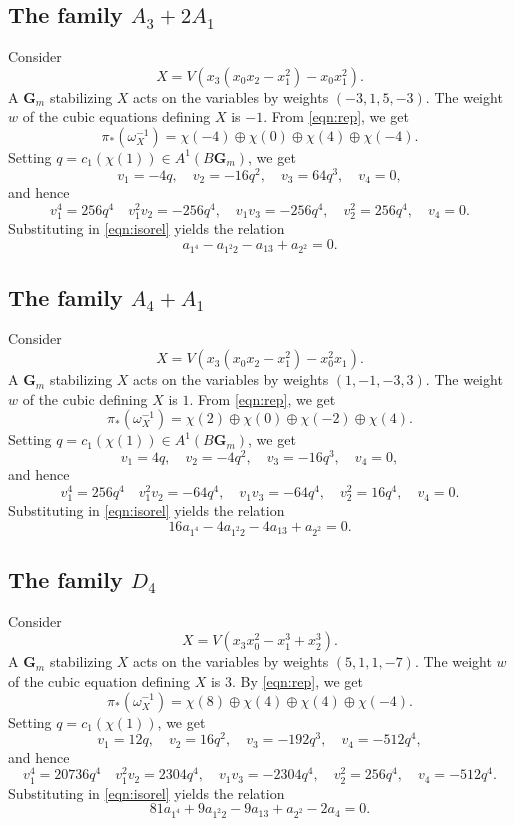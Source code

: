 \documentclass[12pt,reqno]{amsart}
\numberwithin{equation}{section}
\newcommand{\G}{\mathbf G}
\begin{document}
\subsection{The family $A_3 + 2A_1$}
Consider
\[ X = V(x_3(x_0x_2-x_1^2) - x_0x_1^2).\]
A $\G_m$ stabilizing $X$ acts on the variables by weights $(-3,1,5,-3)$.
The weight $w$ of the cubic equations defining $X$ is $-1$.
From \eqref{eqn:rep}, we get
\[ \pi_*\left( \omega_X^{-1} \right) = \chi(-4) \oplus \chi(0) \oplus \chi(4) \oplus \chi(-4).\]
Setting $q = c_1(\chi(1)) \in A^1(B\G_m)$, we get
\[ v_1 = -4q, \quad v_2 = -16q^2, \quad v_3 = 64q^3, \quad v_4 = 0,\]
and hence
\[ v_1^4 = 256q^4 \quad v_1^2v_2 = -256q^4, \quad v_1v_3 = -256q^4, \quad v_2^2 = 256q^4, \quad v_4 = 0.\]
Substituting in \eqref{eqn:isorel} yields the relation
\begin{equation}\label{eqn:iso2}
  a_{1^4} - a_{1^2 2}- a_{13} +  a_{2^2}  = 0.
\end{equation}

\subsection{The family $A_4 + A_1$}
Consider
\[ X = V(x_3(x_0x_2-x_1^2) - x_0^2x_1).\]
A $\G_m$ stabilizing $X$ acts on the variables by weights $(1,-1,-3,3)$.
The weight $w$ of the cubic defining $X$ is $1$.
From \eqref{eqn:rep}, we get
\[ \pi_*\left( \omega_X^{-1} \right) = \chi(2) \oplus \chi(0) \oplus \chi(-2) \oplus \chi(4).\]
Setting $q = c_1(\chi(1)) \in A^1(B\G_m)$, we get
\[ v_1 = 4q, \quad v_2 = -4q^2, \quad v_3 = -16q^3, \quad v_4 = 0,\]
and hence
\[ v_1^4 = 256q^4 \quad v_1^2v_2 = -64q^4, \quad v_1v_3 = -64q^4, \quad v_2^2 = 16q^4, \quad v_4 = 0.\]
Substituting in \eqref{eqn:isorel} yields the relation
\begin{equation}\label{eqn:iso3}
  16a_{1^4} -4a_{1^2 2}- 4a_{13} + a_{2^2}  = 0.
\end{equation}

\subsection{The family $D_4$}
Consider
\[ X = V(x_3x_0^2 - x_1^3+x_2^3).\]
A $\G_m$ stabilizing $X$ acts on the variables by weights $(5,1,1,-7)$.
The weight $w$ of the cubic equation defining $X$ is $3$.
By \eqref{eqn:rep}, we get
\[ \pi_*\left( \omega_X^{-1} \right) = \chi(8) \oplus \chi(4) \oplus \chi(4) \oplus \chi(-4).\]
Setting $q = c_1(\chi(1))$, we get
\[ v_1 = 12q, \quad v_2 = 16q^2, \quad v_3 = -192q^3, \quad v_4 = -512q^4,\]
and hence
\[ v_1^4 = 20736q^4 \quad v_1^2v_2 = 2304q^4, \quad v_1v_3 = -2304q^4, \quad v_2^2 = 256q^4, \quad v_4 = -512q^4.\]
Substituting in \eqref{eqn:isorel} yields the relation
\begin{equation}\label{eqn:iso4}
  81a_{1^4} +9a_{1^2 2}- 9a_{13} +  a_{2^2}-2a_4  = 0.
\end{equation}
\end{document}
